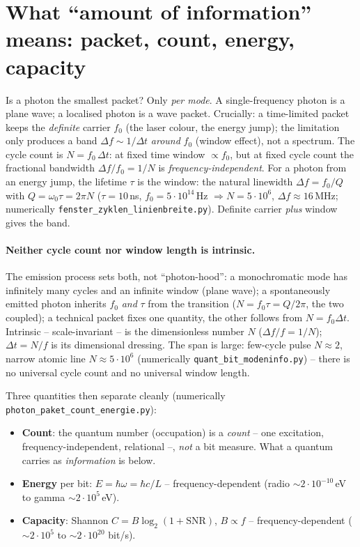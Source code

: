\section{What \enquote{amount of information} means: packet, count, energy, capacity}
Is a photon the smallest packet? Only \emph{per mode}. A single-frequency photon is a plane wave; a
localised photon is a wave packet. Crucially: a time-limited packet keeps the
\emph{definite} carrier $f_0$ (the laser colour, the energy jump); the limitation only produces a band
$\Delta f\sim1/\Delta t$ \emph{around} $f_0$ (window effect), not a spectrum. The cycle count is
$N=f_0\,\Delta t$: at fixed time window $\propto f_0$, but at fixed cycle count the fractional bandwidth
$\Delta f/f_0=1/N$ is \emph{frequency-independent}. For a photon from an energy jump, the lifetime $\tau$
is the window: the natural linewidth $\Delta f=f_0/Q$ with $Q=\omega_0\tau=2\pi N$ ($\tau=10$\,ns,
$f_0=5\cdot10^{14}$\,Hz $\Rightarrow N=5\cdot10^6$, $\Delta f\approx16$\,MHz; numerically
\texttt{fenster\_zyklen\_linienbreite.py}). Definite carrier \emph{plus} window gives the band.

\paragraph{Neither cycle count nor window length is intrinsic.} The emission process sets both, not
\enquote{photon-hood}: a monochromatic mode has infinitely many cycles and an infinite window (plane
wave); a spontaneously emitted photon inherits $f_0$ \emph{and} $\tau$ from the transition
($N=f_0\tau=Q/2\pi$, the two coupled); a technical packet fixes one quantity, the other follows from
$N=f_0\Delta t$. Intrinsic -- scale-invariant -- is the dimensionless number $N$ ($\Delta f/f=1/N$);
$\Delta t=N/f$ is its dimensional dressing. The span is large: few-cycle pulse $N\approx2$, narrow atomic
line $N\approx5\cdot10^6$ (numerically \texttt{quant\_bit\_modeninfo.py}) -- there is no universal cycle
count and no universal window length.

Three quantities then separate cleanly (numerically \texttt{photon\_paket\_count\_energie.py}):

\begin{itemize}
  \item \textbf{Count}: the quantum number (occupation) is a \emph{count} -- one excitation,
        frequency-independent, relational --, \emph{not} a bit measure. What a quantum carries as
        \emph{information} is below.
  \item \textbf{Energy} per bit: $E=\hbar\omega=\hbar c/L$ -- frequency-dependent (radio
        $\sim2\cdot10^{-10}$\,eV to gamma $\sim2\cdot10^{5}$\,eV).
  \item \textbf{Capacity}: Shannon $C=B\log_2(1+\mathrm{SNR})$, $B\propto f$ -- frequency-dependent
        ($\sim2\cdot10^{5}$ to $\sim2\cdot10^{20}$ bit/s).
\end{itemize}

